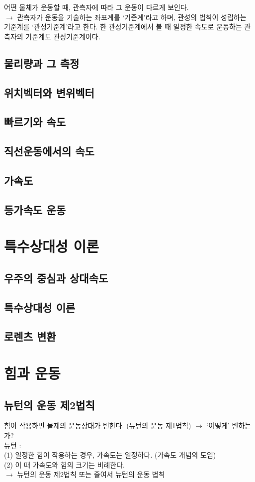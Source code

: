 \documentclass[10pt,a4paper]{report}
\begin{document}
	어떤 물체가 운동할 때, 관측자에 따라 그 운동이 다르게 보인다.\\
	$\rightarrow$ 관측자가 운동을 기술하는 좌표계를 `기준계'라고 하며, 관성의 법칙이 성립하는 기준계를 `관성기준계'라고 한다.
	한 관성기준계에서 볼 때 일정한 속도로 운동하는 관측자의 기준계도 관성기준계이다.
	
	\section{물리량과 그 측정}
	
	\section{위치벡터와 변위벡터}
	
	\section{빠르기와 속도}
	
	\section{직선운동에서의 속도}
	
	\section{가속도}
	
	\section{등가속도 운동}
	
	\chapter{특수상대성 이론}
	
	\section{우주의 중심과 상대속도}
	
	\section{특수상대성 이론}
	
	\section{로렌츠 변환}
	
	\chapter{힘과 운동}
	
	\section{뉴턴의 운동 제2법칙}
	
	힘이 작용하면 물제의 운동상태가 변한다. (뉴턴의 운동 제1법칙) $\rightarrow$ `어떻게' 변하는가?\\
	뉴턴 :\\
	(1) 일정한 힘이 작용하는 경우, 가속도는 일정하다. (가속도 개념의 도입)\\
	(2) 이 때 가속도와 힘의 크기는 비례한다.\\
	$\rightarrow$ 뉴턴의 운동 제2법칙 또는 줄여서 뉴턴의 운동 법칙
	
\end{document}
